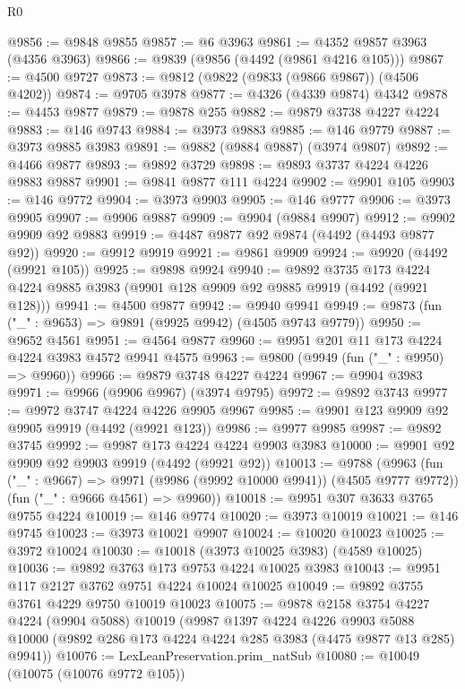 \begin{lexlean}{R0}
\begin{coremodule}
@9856 := @9848 @9855
@9857 := @6 @3963
@9861 := @4352 @9857 @3963 (@4356 @3963)
@9866 := @9839 (@9856 (@4492 (@9861 @4216 @105)))
@9867 := @4500 @9727
@9873 := @9812 (@9822 (@9833 (@9866 @9867)) (@4506 @4202))
@9874 := @9705 @3978
@9877 := @4326 (@4339 @9874) @4342
@9878 := @4453 @9877
@9879 := @9878 @255
@9882 := @9879 @3738 @4227 @4224
@9883 := @146 @9743
@9884 := @3973 @9883
@9885 := @146 @9779
@9887 := @3973 @9885 @3983
@9891 := @9882 (@9884 @9887) (@3974 @9807)
@9892 := @4466 @9877
@9893 := @9892 @3729
@9898 := @9893 @3737 @4224 @4226 @9883 @9887
@9901 := @9841 @9877 @111 @4224
@9902 := @9901 @105
@9903 := @146 @9772
@9904 := @3973 @9903
@9905 := @146 @9777
@9906 := @3973 @9905
@9907 := @9906 @9887
@9909 := @9904 (@9884 @9907)
@9912 := @9902 @9909 @92 @9883
@9919 := @4487 @9877 @92 @9874 (@4492 (@4493 @9877 @92))
@9920 := @9912 @9919
@9921 := @9861 @9909
@9924 := @9920 (@4492 (@9921 @105))
@9925 := @9898 @9924
@9940 := @9892
    @3735
    @173
    @4224
    @4224
    @9885
    @3983
    (@9901 @128 @9909 @92 @9885 @9919 (@4492 (@9921 @128)))
@9941 := @4500 @9877
@9942 := @9940 @9941
@9949 := @9873 (fun ("_" : @9653) => @9891 (@9925 @9942) (@4505 @9743 @9779))
@9950 := @9652 @4561
@9951 := @4564 @9877
@9960 := @9951 @201 @11 @173 @4224 @4224 @3983 @4572 @9941 @4575
@9963 := @9800 (@9949 (fun ("_" : @9950) => @9960))
@9966 := @9879 @3748 @4227 @4224
@9967 := @9904 @3983
@9971 := @9966 (@9906 @9967) (@3974 @9795)
@9972 := @9892 @3743
@9977 := @9972 @3747 @4224 @4226 @9905 @9967
@9985 := @9901 @123 @9909 @92 @9905 @9919 (@4492 (@9921 @123))
@9986 := @9977 @9985
@9987 := @9892 @3745
@9992 := @9987 @173 @4224 @4224 @9903 @3983
@10000 := @9901 @92 @9909 @92 @9903 @9919 (@4492 (@9921 @92))
@10013 := @9788
    (@9963
      (fun ("_" : @9667) => @9971 (@9986 (@9992 @10000 @9941)) (@4505 @9777 @9772))
      (fun ("_" : @9666 @4561) => @9960))
@10018 := @9951 @307 @3633 @3765 @9755 @4224
@10019 := @146 @9774
@10020 := @3973 @10019
@10021 := @146 @9745
@10023 := @3973 @10021 @9907
@10024 := @10020 @10023
@10025 := @3972 @10024
@10030 := @10018 (@3973 @10025 @3983) (@4589 @10025)
@10036 := @9892 @3763 @173 @9753 @4224 @10025 @3983
@10043 := @9951 @117 @2127 @3762 @9751 @4224 @10024 @10025
@10049 := @9892 @3755 @3761 @4229 @9750 @10019 @10023
@10075 := @9878
    @2158
    @3754
    @4227
    @4224
    (@9904 @5088)
    @10019
    (@9987
      @1397
      @4224
      @4226
      @9903
      @5088
      @10000
      (@9892 @286 @173 @4224 @4224 @285 @3983 (@4475 @9877 @13 @285) @9941))
@10076 := LexLeanPreservation.prim_natSub
@10080 := @10049 (@10075 (@10076 @9772 @105))

\end{coremodule}
\end{lexlean}
